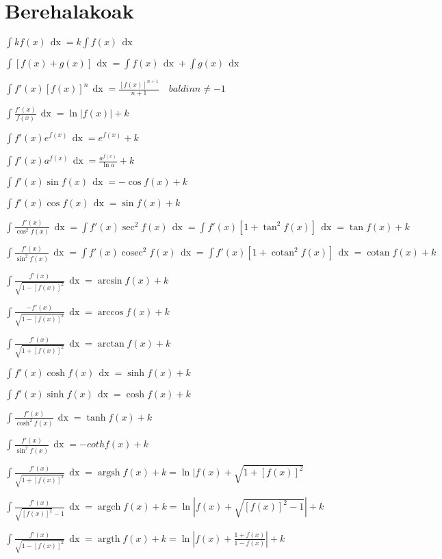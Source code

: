 \documentclass[8pt]{article}
\DeclareMathOperator{\xder}{\, \mathrm{d}x}
\DeclareMathOperator{\argsh}{argsh}
\DeclareMathOperator{\argch}{argch}
\DeclareMathOperator{\argth}{argth}
\DeclareMathOperator{\cosec}{cosec}
\DeclareMathOperator{\cotan}{cotan}
\begin{document}
	
	\section{Berehalakoak}

		$ \int k f(x) \xder = k \int f(x) \xder $

		$ \int [f(x) + g(x)] \xder = \int f(x) \xder + \int g(x) \xder $

		$ \int f\prime(x) {[ f(x) ]}^n \xder = \frac{{[f(x)]}^{n+1}}{n+1} \quad baldin n \neq -1 $

		$ \int \frac{f\prime(x)}{f(x)} \xder = \ln | f(x) | + k $

		$ \int f\prime(x) e^{f(x)} \xder = e^{f(x)} + k $

		$ \int f\prime(x) a^{f(x)} \xder = \frac{a^{f(x)}}{\ln a} + k $

		$ \int f\prime(x) \sin f(x) \xder = - \cos f(x) + k $

		$ \int f\prime(x) \cos f(x) \xder = \sin f(x) + k $

		$ \int \frac{f\prime(x)}{\cos^2 f(x)} \xder = \int f\prime(x) \sec^2 f(x) \xder = 
			\int f\prime(x) [ 1 + \tan^2 f(x) ] \xder = \tan f(x) + k $

		$ \int \frac{f\prime(x)}{\sin^2 f(x)} \xder = \int f\prime(x) \cosec^2 f(x) \xder = 
			\int f\prime(x) [ 1 + \cotan^2 f(x) ] \xder = \cotan f(x) + k $

		$ \int \frac{f\prime(x)}{\sqrt{1 - {[f(x)]}^{2}}} \xder = \arcsin f(x) + k $

		$ \int \frac{-f\prime(x)}{\sqrt{1 - {[f(x)]}^{2}}} \xder = \arccos f(x) + k $

		$ \int \frac{f\prime(x)}{\sqrt{1 + {[f(x)]}^{2}}} \xder = \arctan f(x) + k $

		$ \int f\prime(x) \cosh f(x) \xder = \sinh f(x) + k $

		$ \int f\prime(x) \sinh f(x) \xder = \cosh f(x) + k $

		$ \int \frac{f\prime(x)}{\cosh^2 f(x)} \xder = \tanh f(x) + k $

		$ \int \frac{f\prime(x)}{\sin^2 f(x)} \xder = - coth f(x) + k $

		$ \int \frac{f\prime(x)}{\sqrt{1 + {[f(x)]}^{2}}} \xder = \argsh f(x) + k = 
			\ln | f(x) + \sqrt{1 + {[f(x)]}^{2}} $

		$ \int \frac{f\prime(x)}{\sqrt{{[f(x)]}^{2}} - 1} \xder = \argch f(x) + k = 
			\ln | f(x) + \sqrt{{[f(x)]}^{2} - 1} | + k $

		$ \int \frac{f\prime(x)}{\sqrt{1 - {[f(x)]}^{2}}} \xder = \argth f(x) + k = 
			\ln | f(x) + \frac{1 + f(x)}{1 - f(x)} | + k $
\end{document}
